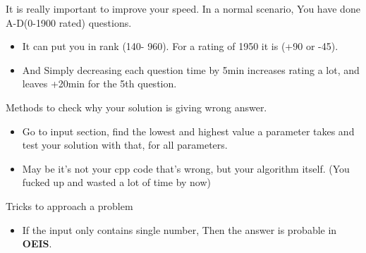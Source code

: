 \documentclass[a4paper,12pt]{report}
\begin{document}
It is really important to improve your speed. In a normal scenario, You have done A-D(0-1900 rated) questions.
\begin{itemize}
	\item  It can put you in rank (140- 960). For a rating of 1950 it is 
	(+90 or -45).
	\item And Simply decreasing each question time by 5min increases rating a lot, and leaves +20min for the 5th question.
\end{itemize}

Methods to check why your solution is giving wrong answer.
\begin{itemize}
	\item Go to input section, find the lowest and highest value a parameter takes and test your solution with that, for all parameters.
	\item May be it's not your cpp code that's wrong, but your algorithm itself. (You fucked up and wasted a lot of time by now)
\end{itemize}

Tricks to approach a problem
\begin{itemize}
	\item If the input only contains single number, Then the answer is probable in \textbf{OEIS}.
\end{itemize}












\end{document}
